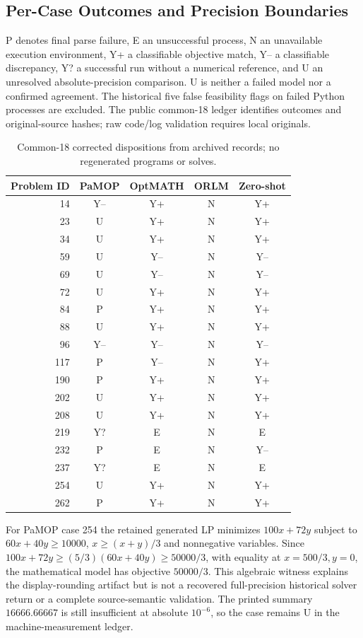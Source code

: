 \subsection{Per-Case Outcomes and Precision Boundaries}
P denotes final parse failure, E an unsuccessful process, N an unavailable execution environment, Y+ a classifiable objective match, Y-- a classifiable discrepancy, Y? a successful run without a numerical reference, and U an unresolved absolute-precision comparison. U is neither a failed model nor a confirmed agreement. The historical five false feasibility flags on failed Python processes are excluded. The public common-18 ledger identifies outcomes and original-source hashes; raw code/log validation requires local originals.
\begin{table}[htbp]\centering\small
\caption{Common-18 corrected dispositions from archived records; no regenerated programs or solves.}\label{tab:llm-cases}
\begin{tabular}{rcccc}\toprule
Problem ID & PaMOP & OptMATH & ORLM & Zero-shot\\\midrule
14 & Y-- & Y+ & N & Y+\\
23 & U & Y+ & N & Y+\\
34 & U & Y+ & N & Y+\\
59 & U & Y-- & N & Y--\\
69 & U & Y-- & N & Y--\\
72 & U & Y+ & N & Y+\\
84 & P & Y+ & N & Y+\\
88 & U & Y+ & N & Y+\\
96 & Y-- & Y-- & N & Y--\\
117 & P & Y-- & N & Y+\\
190 & P & Y+ & N & Y+\\
202 & U & Y+ & N & Y+\\
208 & U & Y+ & N & Y+\\
219 & Y? & E & N & E\\
232 & P & E & N & Y--\\
237 & Y? & E & N & E\\
254 & U & Y+ & N & Y+\\
262 & P & Y+ & N & Y+\\
\bottomrule\end{tabular}\end{table}

For PaMOP case 254 the retained generated LP minimizes $100x+72y$ subject to $60x+40y\geq10000$, $x\geq(x+y)/3$ and nonnegative variables. Since $100x+72y\geq(5/3)(60x+40y)\geq50000/3$, with equality at $x=500/3,y=0$, the mathematical model has objective $50000/3$. This algebraic witness explains the display-rounding artifact but is not a recovered full-precision historical solver return or a complete source-semantic validation. The printed summary $16666.66667$ is still insufficient at absolute $10^{-6}$, so the case remains U in the machine-measurement ledger.

